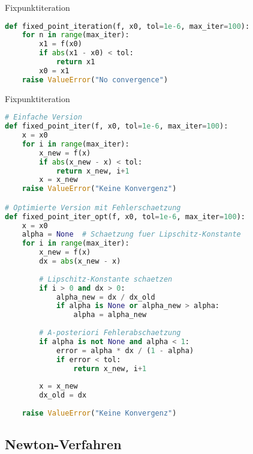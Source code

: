 \begin{examplecode}{Fixpunktiteration}
    \begin{lstlisting}[language=Python, style=basesmol]
def fixed_point_iteration(f, x0, tol=1e-6, max_iter=100):
    for n in range(max_iter):
        x1 = f(x0)
        if abs(x1 - x0) < tol:
            return x1
        x0 = x1
    raise ValueError("No convergence")
    \end{lstlisting}
\end{examplecode}

\begin{examplecode}{Fixpunktiteration}
\begin{lstlisting}[language=Python, style=basesmol]
# Einfache Version
def fixed_point_iter(f, x0, tol=1e-6, max_iter=100):
    x = x0
    for i in range(max_iter):
        x_new = f(x)
        if abs(x_new - x) < tol:
            return x_new, i+1
        x = x_new
    raise ValueError("Keine Konvergenz")

# Optimierte Version mit Fehlerschaetzung
def fixed_point_iter_opt(f, x0, tol=1e-6, max_iter=100):
    x = x0
    alpha = None  # Schaetzung fuer Lipschitz-Konstante
    for i in range(max_iter):
        x_new = f(x)
        dx = abs(x_new - x)
        
        # Lipschitz-Konstante schaetzen
        if i > 0 and dx > 0:
            alpha_new = dx / dx_old
            if alpha is None or alpha_new > alpha:
                alpha = alpha_new
        
        # A-posteriori Fehlerabschaetzung
        if alpha is not None and alpha < 1:
            error = alpha * dx / (1 - alpha)
            if error < tol:
                return x_new, i+1
                
        x = x_new
        dx_old = dx
        
    raise ValueError("Keine Konvergenz")
\end{lstlisting}
\end{examplecode}

\subsection{Newton-Verfahren}

